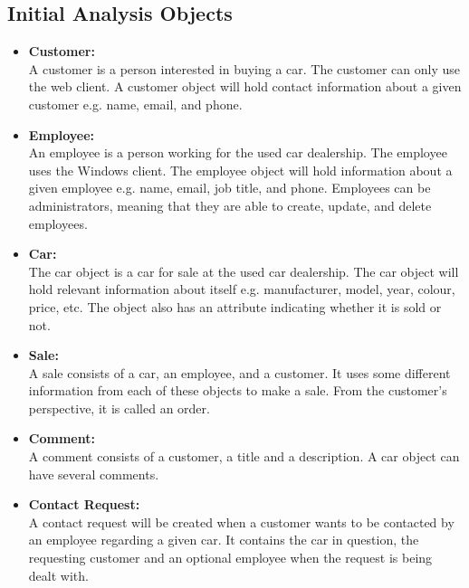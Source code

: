 \subsection{Initial Analysis Objects}
\begin{itemize}
    \item \textbf{Customer:}\\
    A customer is a person interested in buying a car. The customer can only use the web client. A customer object will hold contact information about a given customer e.g. name, email, and phone.
    \item \textbf{Employee:}\\
    An employee is a person working for the used car dealership. The employee uses the Windows client. The employee object will hold information about a given employee e.g. name, email, job title, and phone. Employees can be administrators, meaning that they are able to create, update, and delete employees.
    \item \textbf{Car:}\\
    The car object is a car for sale at the used car dealership. The car object will hold relevant information about itself e.g. manufacturer, model, year, colour, price, etc. The object also has an attribute indicating whether it is sold or not.
    \item \textbf{Sale:}\\
    A sale consists of a car, an employee, and a customer. It uses some different information from each of these objects to make a sale. From the customer's perspective, it is called an order.
    \item \textbf{Comment:}\\
    A comment consists of a customer, a title and a description. A car object can have several comments.
    \item \textbf{Contact Request:}\\
    A contact request will be created when a customer wants to be contacted by an employee regarding a given car. It contains the car in question, the requesting customer and an optional employee when the request is being dealt with.
\end{itemize}
